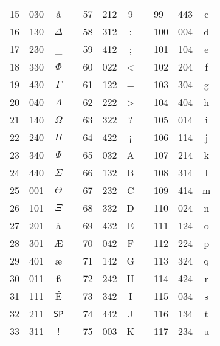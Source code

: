 \documentclass{article}
\begin{document}
\begin{longtable}{|l|l|c|c|l|l|c|c|l|l|c|}
  \cline{1-3}
  \cline{5-7}
  \cline{9-11}
  15 & 030 & å & & 57 & 212 & 9 & & 99 & 443 & c \\
  \cline{1-3}
  \cline{5-7}
  \cline{9-11}
  16 & 130 & $\Delta$ & & 58 & 312 & : & & 100 &004 & d \\
  \cline{1-3}
  \cline{5-7}
  \cline{9-11}
  17 & 230 & \_ & & 59 & 412 & ; & & 101 & 104 & e \\
  \cline{1-3}
  \cline{5-7}
  \cline{9-11}
  18 & 330 & $\Phi$ & & 60 & 022 & < & & 102 & 204 & f \\
  \cline{1-3}
  \cline{5-7}
  \cline{9-11}
  19 & 430 & $\Gamma$ & & 61 & 122 & =  & & 103 & 304 & g \\
  \cline{1-3}
  \cline{5-7}
  \cline{9-11}
  20 & 040 & $\Lambda$ & & 62 & 222 & > & & 104 & 404 & h \\
  \cline{1-3}
  \cline{5-7}
  \cline{9-11}
  21 & 140 & $\Omega$ & & 63 & 322 & ? & & 105 & 014 & i \\
  \cline{1-3}
  \cline{5-7}
  \cline{9-11}
  22 & 240 & $\Pi$ & & 64 & 422 & ¡ & & 106 & 114 & j \\
  \cline{1-3}
  \cline{5-7}
  \cline{9-11}
  23 & 340 & $\Psi$ & & 65 & 032 & A & & 107 & 214 & k \\
  \cline{1-3}
  \cline{5-7}
  \cline{9-11}
  24 & 440 & $\Sigma$ & & 66 & 132 & B & & 108 & 314 & l \\
  \cline{1-3}
  \cline{5-7}
  \cline{9-11}
  25 & 001 & $\Theta$ & & 67 & 232 & C & & 109 & 414 & m \\
  \cline{1-3}
  \cline{5-7}
  \cline{9-11}
  26 & 101 & $\Xi$ & & 68 & 332 & D & & 110 & 024 & n \\
  \cline{1-3}
  \cline{5-7}
  \cline{9-11}
  27 & 201 & à & & 69 & 432 & E & & 111 & 124 & o \\
  \cline{1-3}
  \cline{5-7}
  \cline{9-11}
  28 & 301 & Æ & & 70 & 042 & F & & 112 & 224  & p \\
  \cline{1-3}
  \cline{5-7}
  \cline{9-11}
  29 & 401 & æ & & 71 & 142 & G & & 113 & 324 & q \\
  \cline{1-3}
  \cline{5-7}
  \cline{9-11}
  30 & 011 & ß & & 72 & 242 & H & & 114 & 424 & r \\
  \cline{1-3}
  \cline{5-7}
  \cline{9-11}
  31 & 111 & É & & 73 & 342 & I & & 115 & 034 & s \\
  \cline{1-3}
  \cline{5-7}
  \cline{9-11}
  32 & 211 & \verb+SP+ & & 74 & 442 & J & & 116 & 134 & t \\
  \cline{1-3}
  \cline{5-7}
  \cline{9-11}
  33 & 311 & ! & & 75 & 003 & K & & 117 & 234 & u \\

\end{longtable}
\end{document}
